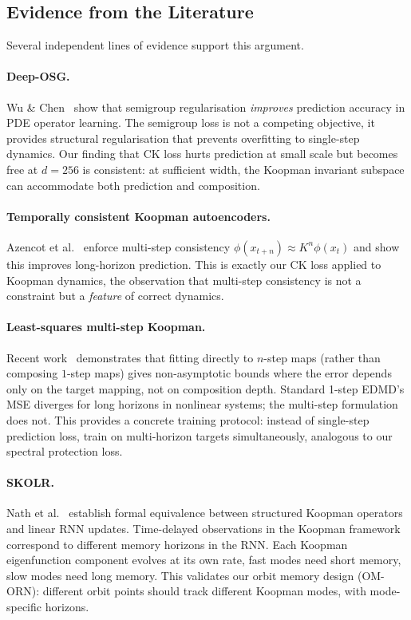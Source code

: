\documentclass[11pt, a4paper]{article}
\theoremstyle{plain}
\theoremstyle{remark}
\begin{document}
\subsection{Evidence from the Literature}

Several independent lines of evidence support this argument.

\paragraph{Deep-OSG.}
Wu \& Chen~\cite{deeposg2023} show that semigroup regularisation \emph{improves} prediction accuracy in PDE operator learning.
The semigroup loss is not a competing objective, it provides structural regularisation that prevents overfitting to single-step dynamics.
Our finding that CK loss hurts prediction at small scale but becomes free at $d{=}256$ is consistent: at sufficient width, the Koopman invariant subspace can accommodate both prediction and composition.

\paragraph{Temporally consistent Koopman autoencoders.}
Azencot et al.~\cite{tckae2025} enforce multi-step consistency $\phi(x_{t+n}) \approx K^n \phi(x_t)$ and show this improves long-horizon prediction.
This is exactly our CK loss applied to Koopman dynamics, the observation that multi-step consistency is not a constraint but a \emph{feature} of correct dynamics.

\paragraph{Least-squares multi-step Koopman.}
Recent work~\cite{lsmsk2025} demonstrates that fitting directly to $n$-step maps (rather than composing $1$-step maps) gives non-asymptotic bounds where the error depends only on the target mapping, not on composition depth.
Standard 1-step EDMD's MSE diverges for long horizons in nonlinear systems; the multi-step formulation does not.
This provides a concrete training protocol: instead of single-step prediction loss, train on multi-horizon targets simultaneously, analogous to our spectral protection loss.

\paragraph{SKOLR.}
Nath et al.~\cite{nath2025skolr} establish formal equivalence between structured Koopman operators and linear RNN updates.
Time-delayed observations in the Koopman framework correspond to different memory horizons in the RNN.
Each Koopman eigenfunction component evolves at its own rate, fast modes need short memory, slow modes need long memory.
This validates our orbit memory design (OM-ORN): different orbit points should track different Koopman modes, with mode-specific horizons.
\end{document}
